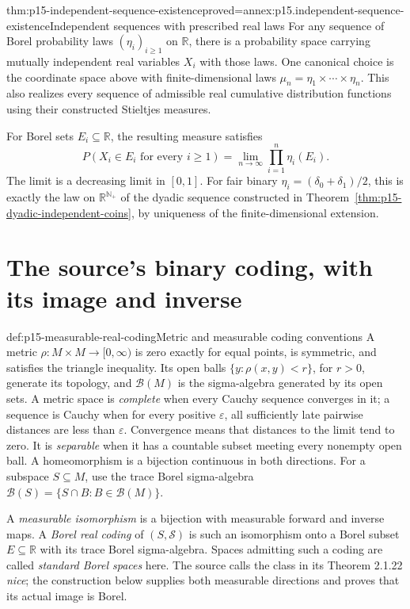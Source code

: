 \begin{hbcorollary}{thm:p15-independent-sequence-existence}{proved=annex:p15.independent-sequence-existence}{Independent sequences with prescribed real laws}
For any sequence of Borel probability laws \((\eta_i)_{i\geq1}\)
on \(\mathbb R\), there is a probability space carrying mutually
independent real variables \(X_i\) with those laws. One canonical
choice is the coordinate space above with finite-dimensional laws
\(\mu_n=\eta_1\times\cdots\times\eta_n\). This also realizes
every sequence of admissible real cumulative distribution functions
using their constructed Stieltjes measures.

For Borel sets \(E_i\subseteq\mathbb R\), the resulting measure satisfies
\[
 P(X_i\in E_i\text{ for every }i\geq1)
                 =\lim_{n\to\infty}\prod_{i=1}^n\eta_i(E_i).
\]
The limit is a decreasing limit in \([0,1]\). For fair binary
\(\eta_i=(\delta_0+\delta_1)/2\), this is exactly the law on
\(\mathbb R^{\mathbb N_+}\) of the dyadic sequence constructed in
Theorem~\ref{thm:p15-dyadic-independent-coins}, by uniqueness of the
finite-dimensional extension.
\end{hbcorollary}

\section{The source's binary coding, with its image and inverse}
\label{sec:p15-sequence-borel-coding}

\begin{hbdefinition}{def:p15-measurable-real-coding}{Metric and measurable coding conventions}
A metric \(\rho:M\times M\to[0,\infty)\) is zero exactly for equal points,
is symmetric, and satisfies the triangle inequality. Its open balls
\(\{y:\rho(x,y)<r\}\), for \(r>0\), generate its topology,
and \(\mathcal B(M)\) is the sigma-algebra
generated by its open sets. A metric space is \emph{complete} when
every Cauchy sequence converges in it; a sequence is Cauchy when for
every positive \(\varepsilon\), all sufficiently late pairwise
distances are less than \(\varepsilon\). Convergence means that distances
to the limit tend to zero. It is \emph{separable} when it has a countable
subset meeting every nonempty open ball. A homeomorphism is a bijection
continuous in both directions. For a subspace \(S\subseteq M\),
use the trace Borel sigma-algebra
\(\mathcal B(S)=\{S\cap B:B\in\mathcal B(M)\}\).

A \emph{measurable isomorphism} is a bijection with measurable forward
and inverse maps. A \emph{Borel real coding} of \((S,\mathcal S)\)
is such an isomorphism onto a Borel subset \(E\subseteq\mathbb R\)
with its trace Borel sigma-algebra. Spaces admitting such a coding are
called \emph{standard Borel spaces} here. The source calls the class
in its Theorem 2.1.22 \emph{nice}; the construction below supplies
both measurable directions and proves that its actual image is Borel.
\end{hbdefinition}


